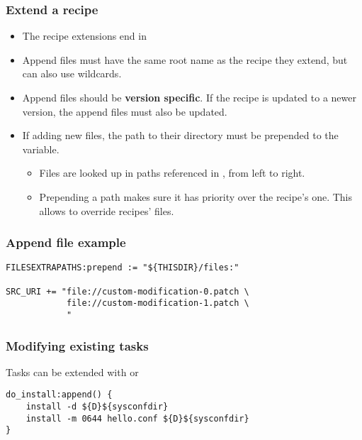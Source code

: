 \begin{frame}[fragile]
  \frametitle{Extend a recipe}
  \begin{itemize}
    \item The recipe extensions end in 
    \item Append files must have the same root name as the recipe they
          extend, but can also use wildcards.
    \item Append files should be {\bf version specific}. If the recipe
      is updated to a newer version, the append files must also be
      updated.
    \item If adding new files, the path to their directory must
          be prepended to the  variable.
    \begin{itemize}
      \item Files are looked up in paths referenced in
            , from left to right.
      \item Prepending a path makes sure it has priority over the recipe's
            one. This allows to override recipes' files.
    \end{itemize}
  \end{itemize}
\end{frame}

\begin{frame}[fragile]
  \frametitle{Append file example}
  \begin{block}{}
    \begin{verbatim}
FILESEXTRAPATHS:prepend := "${THISDIR}/files:"

SRC_URI += "file://custom-modification-0.patch \
            file://custom-modification-1.patch \
            "
    \end{verbatim}
  \end{block}
\end{frame}

\begin{frame}[fragile]
  \frametitle{Modifying existing tasks}
  Tasks can be extended with  or 
  \begin{block}{}
    \begin{verbatim}
do_install:append() {
    install -d ${D}${sysconfdir}
    install -m 0644 hello.conf ${D}${sysconfdir}
}
    \end{verbatim}
  \end{block}
\end{frame}

